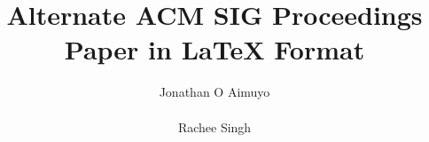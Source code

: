 \documentclass{sig-alternate-per}
\begin{document}
    \title{Alternate {\ttlit ACM} SIG Proceedings Paper in LaTeX
    Format}


    \author{
        \alignauthor
        Jonathan O Aimuyo\\
        \\
        \alignauthor
        Rachee Singh\\
        \\
    }

    \maketitle
    

    

    

    

    
    
\end{document}
